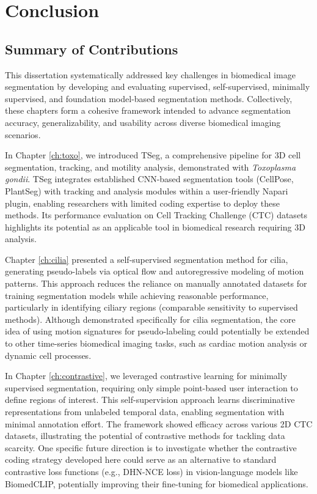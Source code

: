 \documentclass[./dissertation.tex]{subfiles}
\begin{document}
\chapter{Conclusion}
\label{ch:conclusion}


\section{Summary of Contributions}
This dissertation systematically addressed key challenges in biomedical image segmentation by developing and evaluating supervised, self-supervised, minimally supervised, and foundation model-based segmentation methods. Collectively, these chapters form a cohesive framework intended to advance segmentation accuracy, generalizability, and usability across diverse biomedical imaging scenarios.

In Chapter \ref{ch:toxo}, we introduced TSeg, a comprehensive pipeline for 3D cell segmentation, tracking, and motility analysis, demonstrated with \textit{Toxoplasma gondii}. TSeg integrates established CNN-based segmentation tools (CellPose, PlantSeg) with tracking and analysis modules within a user-friendly Napari plugin, enabling researchers with limited coding expertise to deploy these methods. Its performance evaluation on Cell Tracking Challenge (CTC) datasets highlights its potential as an applicable tool in biomedical research requiring 3D analysis.

Chapter \ref{ch:cilia} presented a self-supervised segmentation method for cilia, generating pseudo-labels via optical flow and autoregressive modeling of motion patterns. This approach reduces the reliance on manually annotated datasets for training segmentation models while achieving reasonable performance, particularly in identifying ciliary regions (comparable sensitivity to supervised methods). Although demonstrated specifically for cilia segmentation, the core idea of using motion signatures for pseudo-labeling could potentially be extended to other time-series biomedical imaging tasks, such as cardiac motion analysis or dynamic cell processes.

In Chapter \ref{ch:contrastive}, we leveraged contrastive learning for minimally supervised segmentation, requiring only simple point-based user interaction to define regions of interest. This self-supervision approach learns discriminative representations from unlabeled temporal data, enabling segmentation with minimal annotation effort. The framework showed efficacy across various 2D CTC datasets, illustrating the potential of contrastive methods for tackling data scarcity. One specific future direction is to investigate whether the contrastive coding strategy developed here could serve as an alternative to standard contrastive loss functions (e.g., DHN-NCE loss) in vision-language models like BiomedCLIP, potentially improving their fine-tuning for biomedical applications.
\end{document}
